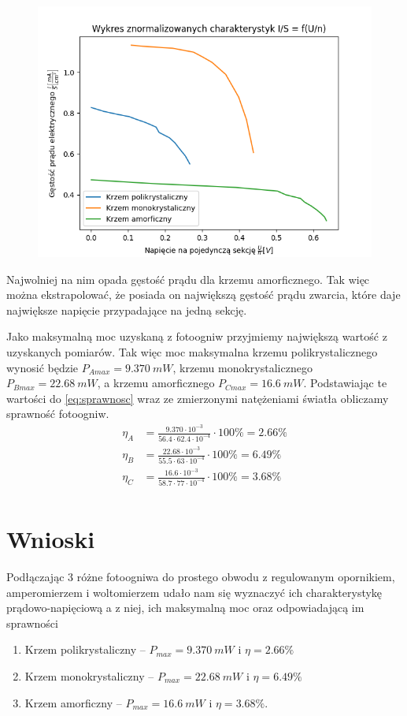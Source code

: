 \documentclass{article}
\begin{document}
\begin{figure}[H]
    \centering
    \includegraphics[scale=0.8]{cw134/charakterystyka1.png}
\end{figure}

Najwolniej na nim opada gęstość prądu dla krzemu amorficznego.
Tak więc można ekstrapolować, że posiada on największą gęstość prądu
zwarcia, które daje największe napięcie przypadające na jedną sekcję.

Jako maksymalną moc uzyskaną z fotoogniw przyjmiemy największą
wartość z uzyskanych pomiarów. Tak więc moc maksymalna krzemu
polikrystalicznego wynosić będzie $P_{Amax} = \SI{9.370}{mW}$,
krzemu monokrystalicznego $P_{Bmax} = \SI{22.68}{mW}$, a krzemu
amorficznego $P_{Cmax} = \SI{16.6}{mW}$.  Podstawiając te wartości do
\eqref{eq:sprawnosc} wraz ze zmierzonymi natężeniami światła obliczamy sprawność fotoogniw.
\begin{align*}
    \eta_A &= \frac{9.370 \cdot 10^{-3}}{56.4 \cdot 62.4 \cdot 10^{-4}}
    \cdot 100\% = 2.66\% \\
    \eta_B &= \frac{22.68 \cdot 10^{-3}}{55.5 \cdot 63 \cdot 10^{-4}}
    \cdot 100\% = 6.49\% \\
    \eta_C &= \frac{16.6 \cdot 10^{-3}}{58.7 \cdot 77 \cdot 10^{-4}}
    \cdot 100\% = 3.68\% \\
\end{align*}

\section{Wnioski}
Podłączając 3 różne fotoogniwa do prostego obwodu z regulowanym
opornikiem, amperomierzem i woltomierzem udało nam się wyznaczyć
ich charakterystykę prądowo-napięciową a z niej, ich maksymalną moc
oraz odpowiadającą im sprawności
\begin{enumerate}
    \item Krzem polikrystaliczny -- $P_{max} = \SI{9.370}{mW}$ i
    $\eta = 2.66\%$
    \item Krzem monokrystaliczny -- $P_{max} = \SI{22.68}{mW}$ i
    $\eta = 6.49\%$
    \item Krzem amorficzny -- $P_{max} = \SI{16.6}{mW}$ i
    $\eta = 3.68\%$.
\end{enumerate}
\end{document}
